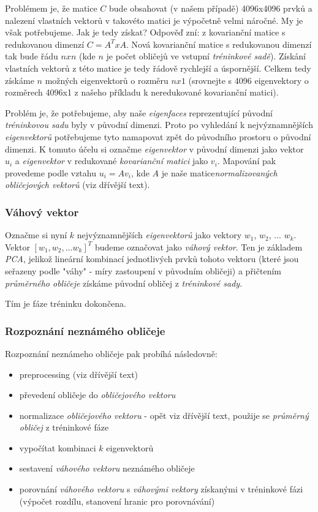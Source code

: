 \documentclass[10pt,a4paper]{article}
\begin{document}
Problémem je, že matice $C$ bude obsahovat (v našem případě) 4096x4096 prvků a nalezení vlastních vektorů v takovéto matici je výpočetně velmi náročné. My je však potřebujeme. Jak je tedy získat? Odpověď zní: z kovarianční matice s redukovanou dimenzí $C=A^TxA$. Nová kovarianční matice s redukovanou dimenzí tak bude řádu $nxn$ (kde $n$ je počet obličejů ve vstupní \textit{tréninkové sadě}). Získání vlastních vektorů z této matice je tedy řádově rychlejší a úspornější. Celkem tedy získáme $n$ možných eigenvektorů o rozměru $nx1$ (srovnejte s 4096 eigenvektory o rozměrech
4096x1 z našeho příkladu k neredukované kovarianční matici).

Problém je, že potřebujeme, aby naše \textit{eigenfaces} reprezentující původní \textit{tréninkovou sadu} byly v původní dimenzi. Proto
po vyhledání k nejvýznamnějších \textit{eigenvektorů} potřebujeme tyto namapovat zpět do původního prostoru o původní dimenzi.
K tomuto účelu si označme \textit{eigenvektor} v původní dimenzi jako vektor $u_i$ a \textit{eigenvektor} v redukované \textit{kovarianční matici}
jako $v_i$. Mapování pak provedeme podle vztahu $u_i=Av_i$, kde $A$ je naše matice\textit{normalizovaných obličejových vektorů} (viz dřívější text).

\subsubsection*{Váhový vektor}

Označme si nyní $k$ nejvýznamnějších \textit{eigenvektorů} jako vektory $w_1$, $w_2$, ... $w_k$. Vektor $[w_1, w_2, ... w_k]^T$ budeme označovat jako \textit{váhový vektor}. Ten je základem \textit{PCA}, jelikož lineární kombinací jednotlivých prvků tohoto vektoru (které jsou seřazeny podle "váhy" - míry zastoupení v původním obličeji) a přičtením \textit{průměrného obličeje} získáme původní obličej z \textit{tréninkové sady}.

Tím je fáze tréninku dokončena.

\subsubsection*{Rozpoznání neznámého obličeje}

Rozpoznání neznámeho obličeje pak probíhá následovně:

\begin{itemize}
	\item preprocessing (viz dřívější text)
	\item převedení obličeje do \textit{obličejového vektoru}
	\item normalizace \textit{obličejového vektoru} - opět viz dřívější text, použije se \textit{průměrný obličej} z tréninkové fáze
	\item vypočítat kombinaci $k$ eigenvektorů
	\item sestavení\textit{ váhového vektoru} neznámého obličeje
	\item porovnání \textit{váhového vektoru} s \textit{váhovými vektory} získanými v tréninkové fázi (výpočet rozdílu, stanovení hranic pro porovnávání)
\end{itemize}
\end{document}
